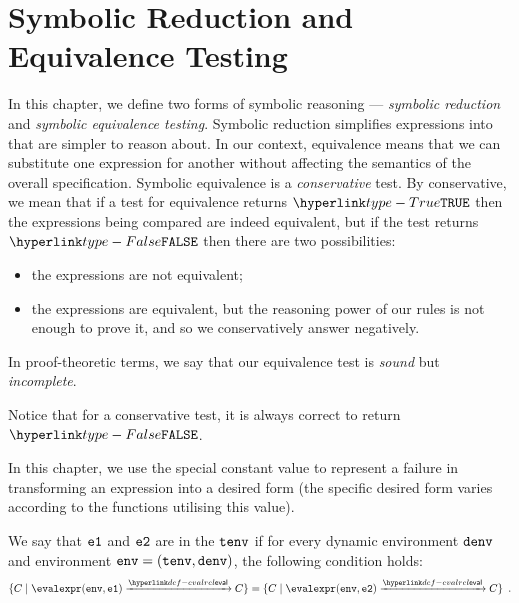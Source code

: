 \chapter{Symbolic Reduction and Equivalence Testing\label{chap:SymbolicEquivalenceTesting}}

In this chapter, we define two forms of symbolic reasoning ---
\emph{symbolic reduction} and \emph{symbolic equivalence testing}.
Symbolic reduction simplifies expressions into \equivalentexprsterm{}
that are simpler to reason about.
In our context, equivalence means that we can substitute one expression for another without
affecting the semantics of the overall specification.
%
Symbolic equivalence is a \emph{conservative} test.
By conservative, we mean that if a test for equivalence returns $\True$ then the expressions
being compared are indeed equivalent, but if the test returns $\False$ then
there are two possibilities:
\begin{itemize}
  \item the expressions are not equivalent;
  \item the expressions are equivalent, but the reasoning power of our rules
  is not enough to prove it, and so we conservatively answer negatively.
\end{itemize}
In proof-theoretic terms, we say that our equivalence test is \emph{sound} but \emph{incomplete}.

Notice that for a conservative test, it is always correct to return $\False$.

In this chapter, we use the special constant value 
to represent a failure in transforming an expression into a desired form (the specific
desired form varies according to the functions utilising this value).

\ChapterOutline

\begin{definition}
\hypertarget{def-equivalentexprsterm}{}
We say that $\texttt{e1}$ and $\texttt{e2}$ are \emph{\equivalentexprsterm{}} in the \staticenvironmentterm{} $\texttt{tenv}$
if for every dynamic environment $\texttt{denv}$
and environment $\texttt{env} = (\texttt{tenv}, \texttt{denv})$, the following condition holds:
\[
\{ C \;|\; \evalexpr(\env, \veone) \evalarrow C \} = \{ C \;|\; \evalexpr(\env, \vetwo) \evalarrow C \} \enspace.
\]
\end{definition}

